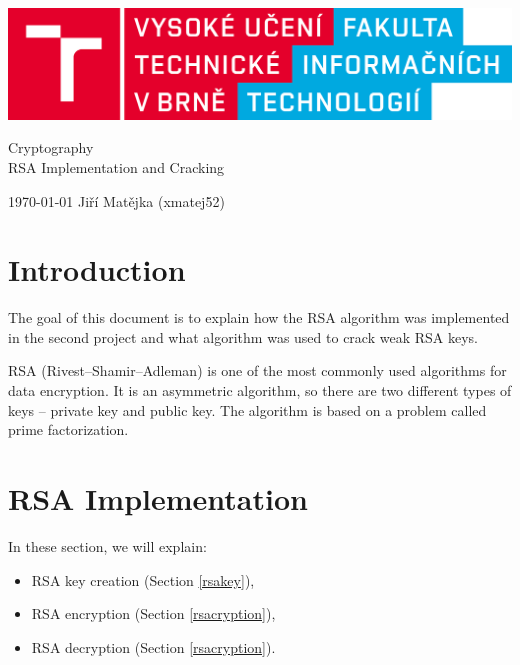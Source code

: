 \documentclass[11pt,a4paper,titlepage]{article}
\begin{document}
		\begin{center}

			\includegraphics[width = 150mm]{logo.png}\\


			\LARGE
			Cryptography\\
			RSA Implementation and Cracking\\

		\end{center}

	\Large{\today} \hfill Jiří Matějka (xmatej52)
	\thispagestyle{empty}
	\newpage
	\setcounter{page}{1}

    \tableofcontents
	\newpage
	\newpage

    \section{Introduction}
        The goal of this document is to explain how the RSA algorithm was implemented in the second project and what algorithm was used to crack weak RSA keys.
        
        RSA (Rivest--Shamir--Adleman) is one of the most commonly used algorithms for data encryption. It is an asymmetric algorithm, so there are two different types of keys -- private key and public key. The algorithm is based on a problem called prime factorization.
    
    \section{RSA Implementation}
        In these section, we will explain:
        \begin{itemize}
            \item RSA key creation (Section \ref{rsakey}),
            \item RSA encryption (Section \ref{rsacryption}),
            \item RSA decryption (Section \ref{rsacryption}).
        \end{itemize}
        
\end{document}
